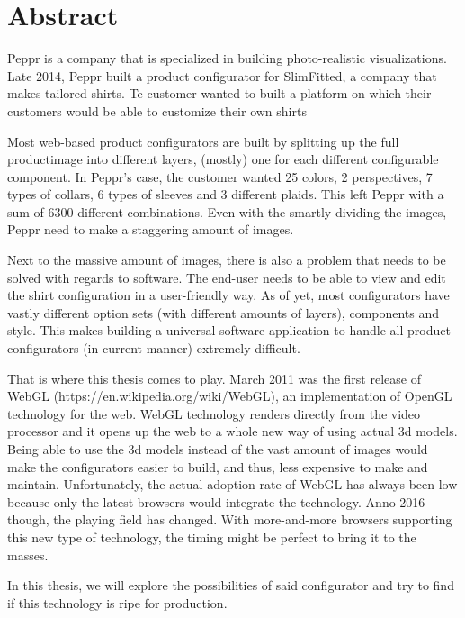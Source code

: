 \chapter*{Abstract}%

Peppr is a company that is specialized in building photo-realistic visualizations. Late 2014, Peppr built a product configurator for SlimFitted, a company that makes tailored shirts. Te customer wanted to built a platform on which their customers would be able to customize their own shirts 

Most web-based product configurators are built by splitting up the full productimage into different layers, (mostly) one for each different configurable component. In Peppr's case, the customer wanted 25 colors, 2 perspectives, 7 types of collars, 6 types of sleeves and 3 different plaids. This left Peppr with a sum of 6300 different combinations. Even with the smartly dividing the images, Peppr need to make a staggering amount of images.

Next to the massive amount of images, there is also a problem that needs to be solved with regards to software. The end-user needs to be able to view and edit the shirt configuration in a user-friendly way. As of yet, most configurators have vastly different option sets (with different amounts of layers), components and style. This makes building a universal software application to handle all product configurators (in current manner) extremely difficult. 

That is where this thesis comes to play. March 2011 was the first release of WebGL (https://en.wikipedia.org/wiki/WebGL), an implementation of OpenGL technology for the web. WebGL technology renders directly from the video processor and it opens up the web to a whole new way of using actual 3d models. Being able to use the 3d models instead of the vast amount of images would make the configurators easier to build, and thus, less expensive to make and maintain. Unfortunately, the actual adoption rate of WebGL has always been low because only the latest browsers would integrate the technology. Anno 2016 though, the playing field has changed. With more-and-more browsers supporting this new type of technology, the timing might be perfect to bring it to the masses.

In this thesis, we will explore the possibilities of said configurator and try to find if this technology is ripe for production.